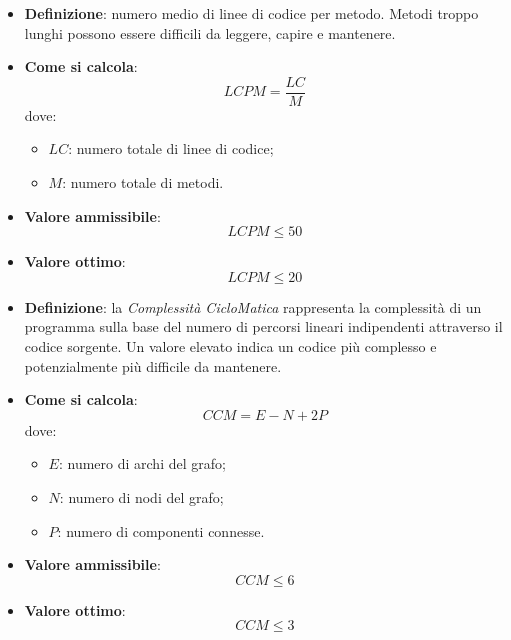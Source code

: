\hypertarget{17M}{}
\begin{itemize}
	\item \textbf{Definizione}: numero medio di linee di codice per metodo. Metodi troppo lunghi possono essere difficili da leggere, capire e mantenere.
	\item \textbf{Come si calcola}: \begin{equation*}LCPM = \frac{LC}{M}\end{equation*} dove:
		\begin{itemize}
			\item $LC$: numero totale di linee di codice;
			\item $M$: numero totale di metodi.
		\end{itemize}
	\item \textbf{Valore ammissibile}: \begin{equation*}LCPM \leq 50\end{equation*}
	\item \textbf{Valore ottimo}: \begin{equation*}LCPM \leq 20\end{equation*}
\end{itemize}

\hypertarget{18M}{}
\begin{itemize}
	\item \textbf{Definizione}: la \textit{Complessità CicloMatica} rappresenta la complessità di un programma sulla base del numero di percorsi lineari indipendenti attraverso il codice sorgente. Un valore elevato indica un codice più complesso e potenzialmente più difficile da mantenere.
	\item \textbf{Come si calcola}: \begin{equation*}CCM = E - N + 2P\end{equation*} dove:
		\begin{itemize}
			\item $E$: numero di archi del grafo;
			\item $N$: numero di nodi del grafo;
			\item $P$: numero di componenti connesse.
		\end{itemize}
	\item \textbf{Valore ammissibile}: \begin{equation*}CCM \leq 6\end{equation*}
	\item \textbf{Valore ottimo}: \begin{equation*}CCM \leq 3\end{equation*}
\end{itemize}



